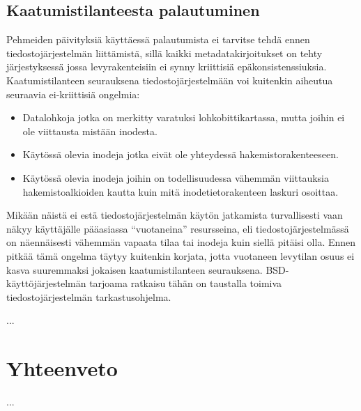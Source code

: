 \subsection{Kaatumistilanteesta palautuminen}
Pehmeiden päivityksiä käyttäessä palautumista ei tarvitse tehdä ennen tiedostojärjestelmän liittämistä,
sillä kaikki metadatakirjoitukset on tehty järjestyksessä jossa levyrakenteisiin ei synny kriittisiä epäkonsistenssiuksia.
Kaatumistilanteen seurauksena tiedostojärjestelmään voi kuitenkin aiheutua seuraavia ei-kriittisiä ongelmia:
\begin{itemize}
    \item{Datalohkoja jotka on merkitty varatuksi lohkobittikartassa, mutta joihin ei ole viittausta mistään inodesta.}
    \item{Käytössä olevia inodeja jotka eivät ole yhteydessä hakemistorakenteeseen.}
    \item{Käytössä olevia inodeja joihin on todellisuudessa vähemmän viittauksia hakemistoalkioiden kautta kuin mitä inodetietorakenteen laskuri osoittaa.}
\end{itemize}
Mikään näistä ei estä tiedostojärjestelmän käytön jatkamista turvallisesti vaan näkyy käyttäjälle pääasiassa ``vuotaneina'' resursseina,
eli tiedostojärjestelmässä on näennäisesti vähemmän vapaata tilaa tai inodeja kuin siellä pitäisi olla.
Ennen pitkää tämä ongelma täytyy kuitenkin korjata,
jotta vuotaneen levytilan osuus ei kasva suuremmaksi jokaisen kaatumistilanteen seurauksena.
BSD-käyttöjärjestelmän tarjoama ratkaisu tähän on taustalla toimiva tiedostojärjestelmän tarkastusohjelma.

...

\section{Yhteenveto}

...
